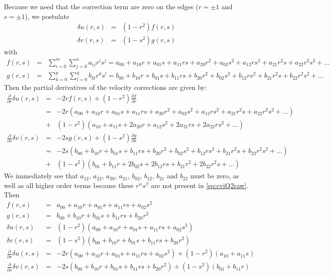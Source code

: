 Because we need that the correction term are zero on the edges ($r=\pm 1$  and $s=\pm 1$), 
we postulate
\begin{eqnarray}
\delta u(r,s) &=& (1-r^2) f(r,s) \nonumber\\
\delta v(r,s) &=& (1-s^2) g(r,s) \nonumber
\end{eqnarray}
with 
\begin{eqnarray}
f(r,s) 
&=& \sum_{i=0}^m\sum_{j=0}^n a_{ij} r^is^j 
=a_{00}+ a_{10}r + a_{01}s + a_{11}rs + a_{20}r^2 + a_{02}s^2 + a_{12}rs^2 + a_{21}r^2s + a_{22}r^2s^2 
+ \dots \nonumber\\
g(r,s) 
&=& \sum_{k=0}^p\sum_{l=0}^q b_{kl} r^ks^l 
=b_{00}+ b_{10}r + b_{01}s + b_{11}rs + b_{20}r^2 + b_{02}s^2 + b_{12}rs^2 + b_{21}r^2s + b_{22}r^2s^2 
+ \dots \nonumber
\end{eqnarray}
Then the partial derivatives of the velocity corrections are 
given by: 
\begin{eqnarray}
\frac{\partial}{\partial r} \delta u(r,s)
&=&-2r f(r,s) + (1-r^2) \frac{\partial f}{\partial r}  \nonumber\\
&=& -2r (a_{00}+ a_{10}r + a_{01}s + a_{11}rs + a_{20}r^2 + a_{02}s^2 + a_{12}rs^2 + a_{21} r^2s + a_{22}r^2s^2 + \dots) \nonumber\\
&+& (1-r^2) (a_{10} + a_{11}s + 2a_{20}r + a_{12}s^2 + 2a_{21} rs + 2a_{22}rs^2 + \dots) \nonumber\\
\frac{\partial }{\partial s} \delta v(r,s)
&=&-2s g(r,s) + (1-s^2) \frac{\partial g}{\partial s} \nonumber\\ 
&=&-2s(b_{00}+ b_{10}r + b_{01}s + b_{11}rs + b_{20}r^2 + b_{02}s^2 + b_{12}rs^2 + b_{21} r^2s + b_{22}r^2s^2 + \dots) \nonumber\\
&+& (1-s^2)(b_{01} + b_{11}r + 2b_{02}s + 2b_{12}rs + b_{21} r^2 + 2b_{22}r^2s + \dots)\nonumber
\end{eqnarray}
We immediately see that $a_{12}$, $a_{22}$, $a_{20}$, $a_{21}$,
$b_{02}$, $b_{12}$, $b_{21}$ and $b_{22}$ must be zero, as well as all 
higher order terms because these $r^\alpha s^\beta$ are not present in \eqref{eq:cviQ2raw}. Then 
\begin{eqnarray}
f(r,s) &=& a_{00} + a_{10} r + a_{01} s + a_{11} rs + a_{02} s^2  \nonumber\\
g(r,s) &=& b_{00} + b_{10} r + b_{01} s + b_{11} rs + b_{20} r^2 \nonumber\\
\delta u(r,s) &=& (1-r^2) (a_{00} + a_{10} r + a_{01} s + a_{11} rs + a_{02} s^2) \nonumber\\
\delta v(r,s) &=& (1-s^2) (b_{00} + b_{10} r + b_{01} s + b_{11} rs + b_{20} r^2) \nonumber\\
\frac{\partial}{\partial r} \delta u(r,s)
&=& -2r (a_{00}+ a_{10}r + a_{01}s + a_{11}rs + a_{02}s^2 ) + (1-r^2) (a_{10} + a_{11}s ) \nonumber\\
\frac{\partial}{\partial s} \delta v(r,s)
&=&-2s(b_{00}+ b_{10}r + b_{01}s + b_{11}rs + b_{20}r^2  ) + (1-s^2)(b_{01} + b_{11}r  )\nonumber
\end{eqnarray}
